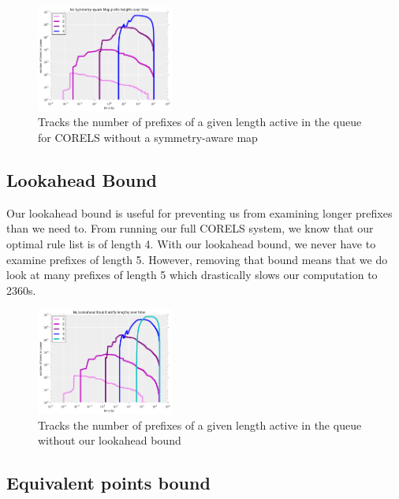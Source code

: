 \begin{figure}[t!]
\begin{center}
\includegraphics[width=0.4\textwidth]{figs/pmap_prefixes.png}
\end{center}
\caption{Tracks the number of prefixes of a given length active in the queue for CORELS without a symmetry-aware map}
\label{fig:pmap-prefixes}
\end{figure}

\subsection{Lookahead Bound}

Our lookahead bound is useful for preventing us from examining longer prefixes than we need to.
From running our full CORELS system, we know that our optimal rule list is of length 4.
With our lookahead bound, we never have to examine prefixes of length 5.
However, removing that bound means that we do look at many prefixes of length 5 which drastically slows our computation to 2360s.

\begin{figure}[t!]
\begin{center}
\includegraphics[width=0.4\textwidth]{figs/lookahead_prefixes.png}
\end{center}
\caption{Tracks the number of prefixes of a given length active in the queue without our lookahead bound}
\label{fig:lookahead-prefixes}
\end{figure}

\subsection{Equivalent points bound}

